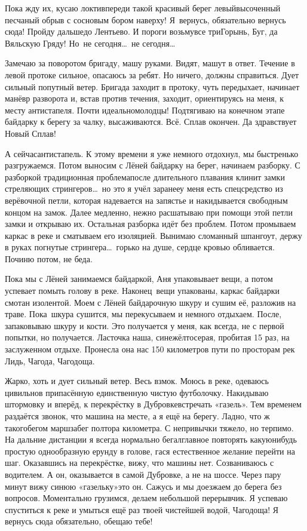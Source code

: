 Пока жду их, кусаю локти\mdash впереди такой красивый берег левый\mdash высоченный песчаный обрыв с сосновым бором наверху! Я~вернусь, обязательно вернусь сюда! Пройду дальше\mdash до Лентьево. И пороги возьму\mdash все три\mdash Горынь, Буг, да Вяльскую Гряду! Но~не сегодня\ldots~не сегодня\ldots 

Замечаю за поворотом бригаду, машу руками. Видят, машут в ответ. Течение в левой протоке сильное, опасаюсь за ребят. Но ничего, должны справиться. Дует сильный попутный ветер. Бригада заходит в протоку, чуть передыхает, начинает манёвр разворота и, встав против течения, заходит, ориентируясь на меня, к месту антистапеля. Почти идеально\mdash  молодцы! Подтягиваю на конечном этапе байдарку к берегу за чалку, высаживаются. Всё. Сплав окончен. Да здравствует Новый Сплав! 

А сейчас\mdash антистапель. К этому времени я уже немного отдохнул, мы быстренько разгружаемся. Потом выносим с Лёней байдарку на берег, начинаем разборку. С разборкой традиционная проблема\mdash после длительного плавания клинит замки стреляющих стрингеров\ldots~но это я учёл заранее\mdash у меня есть спецсредство из верёвочной петли, которая надевается на запястье и накидывается свободным концом на замок. Далее медленно, нежно расшатываю при помощи этой петли замки и открываю их. Остальная разборка идёт без проблем. Потом промываем каркас в реке и сматываем его изоляцией. Вынимаю сломанный шпангоут, держу в руках погнутые стрингера\ldots~горько на душе, сердце кровью обливается. Починю потом, не беда. 

Пока мы с Лёней занимаемся байдаркой, Аня упаковывает вещи, а потом успевает помыть голову в реке. Наконец~вещи упакованы, каркас байдарки смотан изолентой. Моем с Лёней байдарочную шкуру и сушим её, разложив на траве. Пока~шкура сушится, мы перекусываем и немного отдыхаем. После, запаковываю шкуру и кости. Это получается у меня, как всегда, не с первой попытки, но получается. Ласточка наша, сине\sdash жёлто\sdash серая, пробитая 15 раз, на заслуженном отдыхе. Пронесла она нас 150 километров пути по просторам рек Лидь, Чагода, Чагодоща. 

Жарко, хоть и дует сильный ветер. Весь взмок. Моюсь в реке, одеваюсь цивильно\mdash в припасённую единственную чистую футболочку. Накидываю штормовку и вперёд, к перекрёстку в Дубровке\mdash встречать «газель». Тем временем раздаётся звонок, что машина на месте, а я ещё на берегу. Ладно, что ж такого\mdash бегом марш\mdash забег полтора километра. С непривычки тяжело, но терпимо. На дальние дистанции я всегда нормально бегал\mdash главное повторять какую\sdash нибудь простую однообразную ерунду в голове, гася естественное желание перейти на шаг. Оказавшись на перекрёстке, вижу, что машины нет. Созваниваюсь с водителем. А он, оказывается в самой Дубровке, а не на шоссе. Через пару минут вижу синюю «газельку»\mdash это он. Сажусь и мы доезжаем до берега без вопросов. Моментально грузимся, делаем небольшой перерывчик. Я успеваю спуститься к реке и умыться ещё раз твоей чистейшей водой, Чагодоща! Я вернусь сюда обязательно, обещаю тебе!

